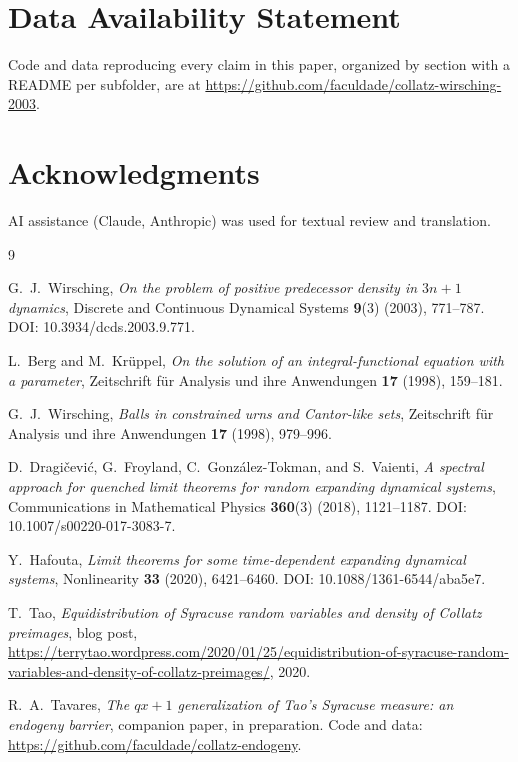 \documentclass[11pt]{article}
\theoremstyle{remark}
\begin{document}
\section*{Data Availability Statement}

Code and data reproducing every claim in this paper, organized by
section with a README per subfolder, are at
\url{https://github.com/faculdade/collatz-wirsching-2003}.

\section*{Acknowledgments}

AI assistance (Claude, Anthropic) was used for textual review and
translation.


\begin{thebibliography}{9}

 G.\ J.\ Wirsching, \emph{On the problem of
  positive predecessor density in $3n+1$ dynamics}, Discrete and
  Continuous Dynamical Systems \textbf{9}(3) (2003), 771--787.
  DOI: 10.3934/dcds.2003.9.771.

 L.\ Berg and M.\ Kr\"uppel, \emph{On the
  solution of an integral-functional equation with a parameter},
  Zeitschrift f\"ur Analysis und ihre Anwendungen \textbf{17} (1998),
  159--181.

 G.\ J.\ Wirsching, \emph{Balls in
  constrained urns and Cantor-like sets}, Zeitschrift f\"ur Analysis
  und ihre Anwendungen \textbf{17} (1998), 979--996.

 D.\ Dragi\v{c}evi\'c, G.\ Froyland,
  C.\ Gonz\'alez-Tokman, and S.\ Vaienti, \emph{A spectral approach
  for quenched limit theorems for random expanding dynamical systems},
  Communications in Mathematical Physics \textbf{360}(3) (2018),
  1121--1187. DOI: 10.1007/s00220-017-3083-7.

 Y.\ Hafouta, \emph{Limit theorems for some
  time-dependent expanding dynamical systems}, Nonlinearity
  \textbf{33} (2020), 6421--6460.
  DOI: 10.1088/1361-6544/aba5e7.

 T.\ Tao, \emph{Equidistribution of Syracuse random
  variables and density of Collatz preimages}, blog post,
  \url{https://terrytao.wordpress.com/2020/01/25/equidistribution-of-syracuse-random-variables-and-density-of-collatz-preimages/},
  2020.

 R.\ A.\ Tavares, \emph{The $qx+1$
  generalization of Tao's Syracuse measure: an endogeny barrier},
  companion paper, in preparation. Code and data:
  \url{https://github.com/faculdade/collatz-endogeny}.

\end{thebibliography}
\end{document}
